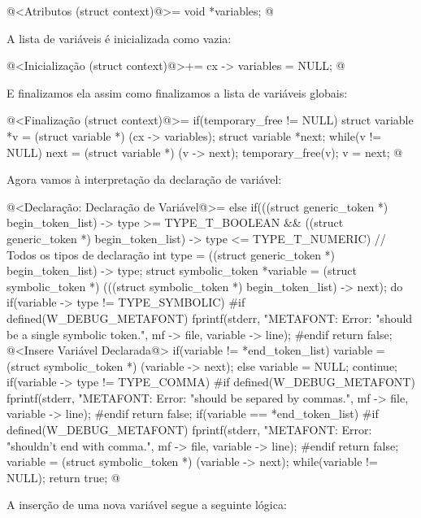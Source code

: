 \iniciocodigo
@<Atributos (struct context)@>=
  void *variables;
@
\fimcodigo

A lista de variáveis é inicializada como vazia:

\iniciocodigo
@<Inicialização (struct context)@>+=
cx -> variables = NULL;
@
\fimcodigo

E finalizamos ela assim como finalizamos a lista de variáveis globais:

\iniciocodigo
@<Finalização (struct context)@>=
if(temporary_free != NULL){
  struct variable *v = (struct variable *) (cx -> variables);
  struct variable *next;
  while(v != NULL){
    next = (struct variable *) (v -> next);
    temporary_free(v);
    v = next;
  }
}
@
\fimcodigo

Agora vamos à interpretação da declaração de variável:

\iniciocodigo
@<Declaração: Declaração de Variável@>=
else if(((struct generic_token *) begin_token_list) -> type >=
        TYPE_T_BOOLEAN &&
        ((struct generic_token *) begin_token_list) -> type <=
        TYPE_T_NUMERIC){ // Todos os tipos de declaração
  int type = ((struct generic_token *) begin_token_list) -> type;
  struct symbolic_token *variable = (struct symbolic_token *)
           (((struct symbolic_token *) begin_token_list) -> next);
  do{
    if(variable -> type != TYPE_SYMBOLIC){
#if defined(W_DEBUG_METAFONT)
      fprintf(stderr, "METAFONT: Error: %
                    "should be a single symbolic token.\n", mf -> file,
                    variable -> line);
#endif
      return false;
    }
    @<Insere Variável Declarada@>
    if(variable != *end_token_list)
      variable = (struct symbolic_token *) (variable -> next);
    else{
      variable = NULL;
      continue;
    }
    if(variable -> type != TYPE_COMMA){
#if defined(W_DEBUG_METAFONT)
      fprintf(stderr, "METAFONT: Error: %
                    "should be separed by commas.\n", mf -> file,
                    variable -> line);
#endif
      return false;
    }
    if(variable == *end_token_list){
#if defined(W_DEBUG_METAFONT)
      fprintf(stderr, "METAFONT: Error: %
                    "shouldn't end with comma.\n", mf -> file,
                    variable -> line);
#endif
      return false;
    }
    variable = (struct symbolic_token *) (variable -> next);
  } while(variable != NULL);
  return true;
}
@
\fimcodigo

A inserção de uma nova variável segue a seguinte lógica:


